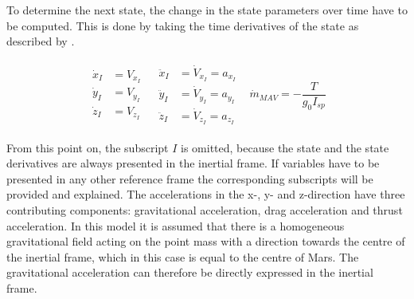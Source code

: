 

\noindent
To determine the next state, the change in the state parameters over time have to be computed. This is done by taking the time derivatives of the state as described by .

\begin{align} \label{eq:state_derivativesModel}
\begin{split} 
\dot{x}_{I}&=V_{x_{I}}\\
\dot{y}_{I}&=V_{y_{I}}\\
\dot{z}_{I}&=V_{z_{I}}
\end{split} 
&
\begin{split}
\ddot{x}_{I}&=\dot{V}_{x_{I}}=a_{x_{I}}\\
\ddot{y}_{I}&=\dot{V}_{y_{I}}=a_{y_{I}}\\
\ddot{z}_{I}&=\dot{V}_{z_{I}}=a_{z_{I}}
\end{split}
&
\dot{m}_{MAV}=-\dfrac{T}{g_{0}I_{sp}}
\end{align}




\noindent
From this point on, the subscript $I$ is omitted, because the state and the state derivatives are always presented in the inertial frame. If variables have to be presented in any other reference frame the corresponding subscripts will be provided and explained. The accelerations in the x-, y- and z-direction have three contributing components: gravitational acceleration, drag acceleration and thrust acceleration. In this model it is assumed that there is a homogeneous gravitational field acting on the point mass with a direction towards the centre of the inertial frame, which in this case is equal to the centre of Mars. The gravitational acceleration can therefore be directly expressed in the inertial frame. 

